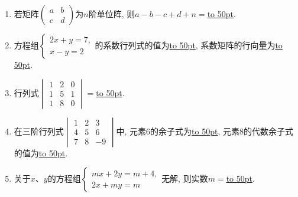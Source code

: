 \documentclass[10pt,a4paper]{article}
\newcommand{\blank}[1]{\underline{\hbox to #1pt{}}}
\begin{document}
\begin{enumerate}[1.]
\item 若矩阵$\begin{pmatrix}a & b \\ c & d\end{pmatrix}$为$n$阶单位阵, 则$a-b-c+d+n=$\blank{50}.
\item 方程组$\begin{cases} 2x+y=7, \\ x-y=2 \end{cases}$的系数行列式的值为\blank{50}, 系数矩阵的行向量为\blank{50}.
\item 行列式$\begin{vmatrix}1 & 2 & 0 \\ 1 & 5 & 1 \\ 1 & 8 & 0 \end{vmatrix}=$\blank{50}.
\item 在三阶行列式$\begin{vmatrix}1 & 2 & 3 \\4 & 5 & 6  \\7 & 8 & -9 \end{vmatrix}$中, 元素$6$的余子式为\blank{50}, 元素$8$的代数余子式的值为\blank{50}.
\item 关于$x$、$y$的方程组$\begin{cases} mx+2y=m+4, \\ 2x+my=m \end{cases}$无解, 则实数$m=$\blank{50}.


\end{enumerate}
\end{document}
